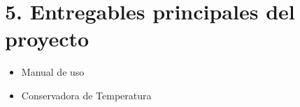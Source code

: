 \section{5. Entregables principales del proyecto}
\label{sec:entregables}

\begin{itemize}
\item Manual de uso
\item Conservadora de Temperatura
\end{itemize}